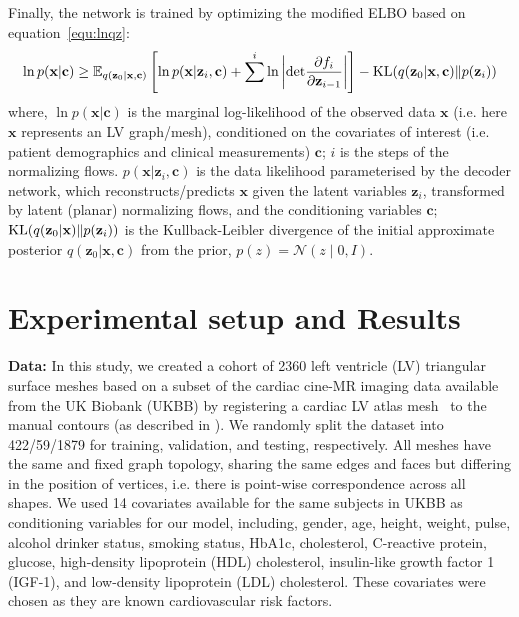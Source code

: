 \documentclass[runningheads]{llncs}
\begin{document}
Finally, the network is trained by optimizing the modified ELBO based on equation~\ref{equ:lnqz}:
\begin{equation}
    \ln p(\textbf{x} \vert \textbf{c}) \geq \mathbb{E}_{q(\textbf{z}_{0} \vert \textbf{x}, \textbf{c})} \left\lbrack \ln p(\textbf{x} \vert \textbf{z}_{i}, \textbf{c}) + \sum^{i} \ln \left\vert {\rm det} \frac{\partial f_{i}}{\partial \textbf{z}_{i-1}} \right\vert \right\rbrack - {\rm KL}(q(\textbf{z}_{0} \vert \textbf{x}, \textbf{c}) \| p(\textbf{z}_i))
\end{equation}
where, $\ln p(\textbf{x} \vert \textbf{c})$ is the marginal log-likelihood of the observed data $\textbf{x}$ (i.e. here $\mathbf{x}$ represents an LV graph/mesh), conditioned on the covariates of interest (i.e. patient demographics and clinical measurements) $\textbf{c}$; $i$ is the steps of the normalizing flows. $p(\textbf{x}\vert\textbf{z}_{i}, \textbf{c})$ is the data likelihood parameterised by the decoder network, which reconstructs/predicts $\textbf{x}$ given the latent variables $\textbf{z}_{i}$, transformed by latent (planar) normalizing flows, and the conditioning variables $\textbf{c}$; ${\rm KL}(q(\textbf{z}_{0} \vert \textbf{x}) \| p(\textbf{z}_i))$ is the Kullback-Leibler divergence of the initial approximate posterior $q(\textbf{z}_{0} \vert \textbf{x}, \textbf{c})$ from the prior, $p(z)=\mathcal{N}(z \mid 0, I)$.

\section{Experimental setup and  Results}

\textbf{Data:} In this study, we created a cohort of 2360 left ventricle (LV) triangular surface meshes based on a subset of the cardiac cine-MR imaging data available from the UK Biobank (UKBB) by registering a cardiac LV atlas mesh~\cite{rodero2021linking} to the manual contours (as described in \cite{xia2022automatic}). We randomly split the dataset into 422/59/1879 for training, validation, and testing, respectively. All meshes have the same and fixed graph topology, sharing the same edges and faces but differing in the position of vertices, i.e. there is point-wise correspondence across all shapes. We used 14 covariates available for the same subjects in UKBB as conditioning variables for our model, including, gender, age, height, weight, pulse, alcohol drinker status, smoking status, HbA1c, cholesterol, C-reactive protein, glucose, high-density lipoprotein (HDL) cholesterol, insulin-like growth factor 1 (IGF-1), and low-density lipoprotein (LDL) cholesterol. These covariates were chosen as they are known cardiovascular risk factors.
\end{document}
